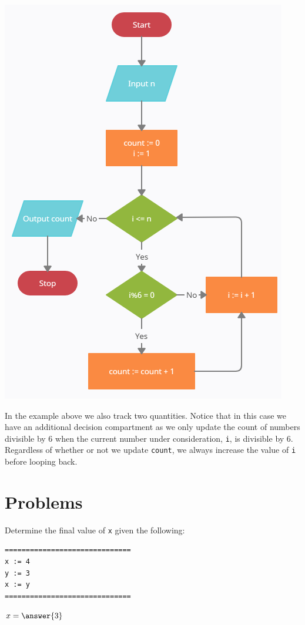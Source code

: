 \documentclass{ximera}
\begin{document}
\begin{center}
	\includegraphics{divby6count.png}
\end{center}

In the example above we also track two quantities. Notice that in this case we have an additional decision compartment as we only update the count of numbers divisible by 6 when the current number under consideration, \verb|i|, is divisible by 6. Regardless of whether or not we update \verb|count|, we always increase the value of \verb|i| before looping back.

\section{Problems}

\begin{question}
	Determine the final value of \verb|x| given the following:
	\begin{verbatim}
==============================
x := 4
y := 3
x := y
==============================
	\end{verbatim}
	$x = \answer{3}$
\end{question}
\end{document}
